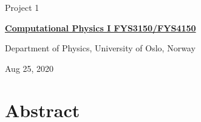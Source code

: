 \documentclass[%
oneside,                 %
final,                   %
10pt]{article}
\begin{document}

\newcommand{\exercisesection}[1]{\subsection*{#1}}






\thispagestyle{empty}

\begin{center}
{\LARGE\bf
\begin{spacing}{1.25}
Project 1
\end{spacing}
}
\end{center}


\begin{center}
{\bf \href{{http://www.uio.no/studier/emner/matnat/fys/FYS3150/index-eng.html}}{Computational Physics I FYS3150/FYS4150}}
\end{center}

    \begin{center}
\centerline{{\small Department of Physics, University of Oslo, Norway}}
\end{center}


\begin{center}
Aug 25, 2020
\end{center}

\vspace{1cm}

\section{Abstract}
\end{document}
